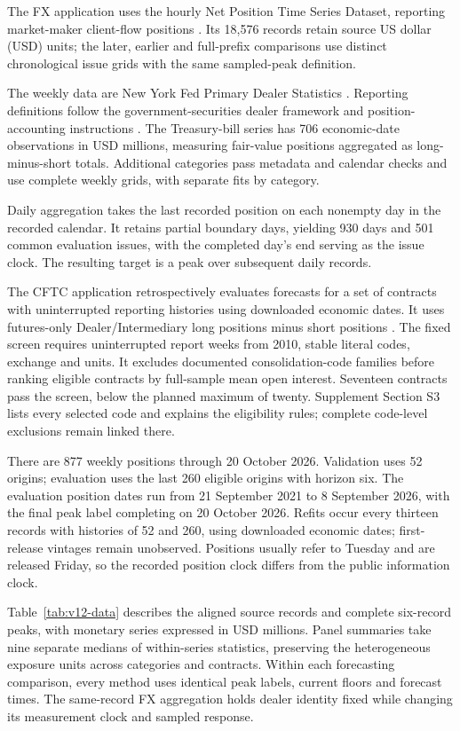 \documentclass[11pt,a4paper]{article}
\begin{document}
The FX application uses the hourly Net Position Time Series Dataset, reporting market-maker client-flow positions \citep{dataset,wisniewski2020}. Its 18,576 records retain source US dollar (USD) units; the later, earlier and full-prefix comparisons use distinct chronological issue grids with the same sampled-peak definition.

The weekly data are New York Fed Primary Dealer Statistics \citep{nyfeddata}. Reporting definitions follow the government-securities dealer framework and position-accounting instructions \citep{fr2004_2013,fr2004_2024}. The Treasury-bill series has 706 economic-date observations in USD millions, measuring fair-value positions aggregated as long-minus-short totals. Additional categories pass metadata and calendar checks and use complete weekly grids, with separate fits by category.

Daily aggregation takes the last recorded position on each nonempty day in the recorded calendar. It retains partial boundary days, yielding 930 days and 501 common evaluation issues, with the completed day's end serving as the issue clock. The resulting target is a peak over subsequent daily records.

The CFTC application retrospectively evaluates forecasts for a set of contracts with uninterrupted reporting histories using downloaded economic dates. It uses futures-only Dealer/Intermediary long positions minus short positions \citep{cftcTFF}. The fixed screen requires uninterrupted report weeks from 2010, stable literal codes, exchange and units. It excludes documented consolidation-code families before ranking eligible contracts by full-sample mean open interest. Seventeen contracts pass the screen, below the planned maximum of twenty. Supplement Section S3 lists every selected code and explains the eligibility rules; complete code-level exclusions remain linked there.

There are 877 weekly positions through 20 October 2026. Validation uses 52 origins; evaluation uses the last 260 eligible origins with horizon six. The evaluation position dates run from 21 September 2021 to 8 September 2026, with the final peak label completing on 20 October 2026. Refits occur every thirteen records with histories of 52 and 260, using downloaded economic dates; first-release vintages remain unobserved. Positions usually refer to Tuesday and are released Friday, so the recorded position clock differs from the public information clock.

Table~\ref{tab:v12-data} describes the aligned source records and complete six-record peaks, with monetary series expressed in USD millions. Panel summaries take nine separate medians of within-series statistics, preserving the heterogeneous exposure units across categories and contracts. Within each forecasting comparison, every method uses identical peak labels, current floors and forecast times. The same-record FX aggregation holds dealer identity fixed while changing its measurement clock and sampled response.
\end{document}
